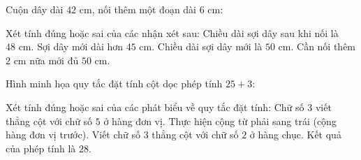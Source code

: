 \begin{ex} %
Cuộn dây dài $42\text{ cm}$, nối thêm một đoạn dài $6\text{ cm}$:
\begin{center}
\end{center}
Xét tính đúng hoặc sai của các nhận xét sau:
\choiceTF
{\True Chiều dài sợi dây sau khi nối là $48\text{ cm}$.}
{\True Sợi dây mới dài hơn $45\text{ cm}$.}
{Chiều dài sợi dây mới là $50\text{ cm}$.}
{\True Cần nối thêm $2\text{ cm}$ nữa mới đủ $50\text{ cm}$.}
\end{ex}

\begin{ex} %
Hình minh họa quy tắc đặt tính cột dọc phép tính $25 + 3$:
\begin{center}
\end{center}
Xét tính đúng hoặc sai của các phát biểu về quy tắc đặt tính:
\choiceTF
{\True Chữ số $3$ viết thẳng cột với chữ số $5$ ở hàng đơn vị.}
{\True Thực hiện cộng từ phải sang trái (cộng hàng đơn vị trước).}
{Viết chữ số $3$ thẳng cột với chữ số $2$ ở hàng chục.}
{\True Kết quả của phép tính là $28$.}
\end{ex}

